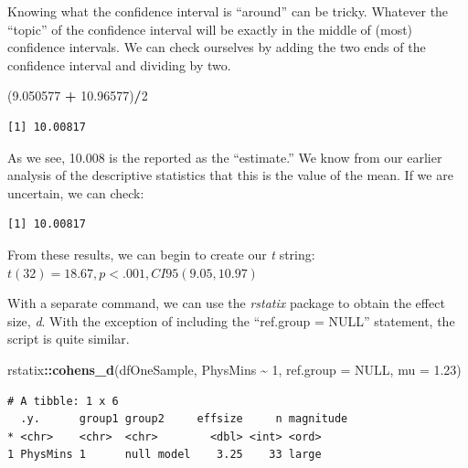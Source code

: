 \documentclass[
  11pt,
]{book}
\newenvironment{Shaded}{\begin{snugshade}}{\end{snugshade}}
\newcommand{\AttributeTok}[1]{\textcolor[rgb]{0.27,0.27,0.27}{#1}}
\newcommand{\ConstantTok}[1]{\textcolor[rgb]{0.37,0.37,0.37}{#1}}
\newcommand{\DecValTok}[1]{\textcolor[rgb]{0.06,0.06,0.06}{#1}}
\newcommand{\FloatTok}[1]{\textcolor[rgb]{0.06,0.06,0.06}{#1}}
\newcommand{\FunctionTok}[1]{\textcolor[rgb]{0.27,0.27,0.27}{\textbf{#1}}}
\newcommand{\NormalTok}[1]{#1}
\newcommand{\SpecialCharTok}[1]{\textcolor[rgb]{0.43,0.43,0.43}{\textbf{#1}}}
\begin{document}
Knowing what the confidence interval is ``around'' can be tricky. Whatever the ``topic'' of the confidence interval will be exactly in the middle of (most) confidence intervals. We can check ourselves by adding the two ends of the confidence interval and dividing by two.

\begin{Shaded}
\begin{Highlighting}[]
\NormalTok{(}\FloatTok{9.050577} \SpecialCharTok{+} \FloatTok{10.96577}\NormalTok{)}\SpecialCharTok{/}\DecValTok{2}
\end{Highlighting}
\end{Shaded}

\begin{verbatim}
[1] 10.00817
\end{verbatim}

As we see, 10.008 is the reported as the ``estimate.'' We know from our earlier analysis of the descriptive statistics that this is the value of the mean. If we are uncertain, we can check:

\begin{Shaded}
\end{Shaded}

\begin{verbatim}
[1] 10.00817
\end{verbatim}

From these results, we can begin to create our \emph{t} string: \(t(32) = 18.67, p < .001, CI95(9.05, 10.97)\)

With a separate command, we can use the \emph{rstatix} package to obtain the effect size, \emph{d}. With the exception of including the ``ref.group = NULL'' statement, the script is quite similar.

\begin{Shaded}
\begin{Highlighting}[]
\NormalTok{rstatix}\SpecialCharTok{::}\FunctionTok{cohens\_d}\NormalTok{(dfOneSample, PhysMins }\SpecialCharTok{\textasciitilde{}} \DecValTok{1}\NormalTok{, }\AttributeTok{ref.group =} \ConstantTok{NULL}\NormalTok{, }\AttributeTok{mu =} \FloatTok{1.23}\NormalTok{)}
\end{Highlighting}
\end{Shaded}

\begin{verbatim}
# A tibble: 1 x 6
  .y.      group1 group2     effsize     n magnitude
* <chr>    <chr>  <chr>        <dbl> <int> <ord>    
1 PhysMins 1      null model    3.25    33 large    
\end{verbatim}
\end{document}
